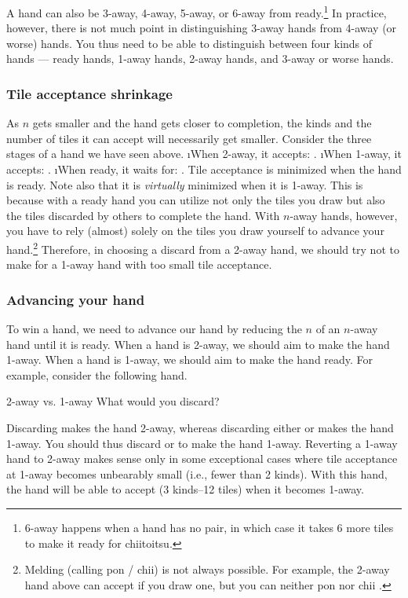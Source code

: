 \bigskip
A hand can also be 3-away, 4-away, 5-away, or 6-away from ready.\footnote{6-away happens when a hand has no pair, in which case it takes 6 more tiles to make it ready for {\jap chiitoitsu}.}  
In practice, however, there is not much point in distinguishing 3-away hands from 4-away (or worse) hands. You thus need to be able to distinguish between four kinds of hands --- ready hands, 1-away hands, 2-away hands, and 3-away or worse hands. 

\subsubsection{Tile acceptance shrinkage} 
As $n$ gets smaller and the hand gets closer to completion, the kinds and the number of tiles it can accept will necessarily get smaller. Consider the three stages of a hand we have seen above.
\bi
\i When 2-away, it accepts: {\LARGE{}}.
\i When 1-away, it accepts: {\LARGE{}}.
\i When ready, it waits for: {\LARGE{}}.
\ei
Tile acceptance is minimized when the hand is ready. Note also that it is \emph{virtually} minimized when it is 1-away. This is because with a ready hand you can utilize not only the tiles you draw but also the tiles discarded by others to complete the hand. With $n$-away hands, however, you have to rely (almost) solely on the tiles you draw yourself to advance your hand.\footnote{Melding (calling {\jap pon} / {\jap chii}) is not always possible. For example, the 2-away hand above can accept  if you draw one, but you can neither {\jap pon} nor {\jap chii} .} 
Therefore, in choosing a discard from a 2-away hand, we should try not to make for a 1-away hand with too small tile acceptance.

\subsubsection{Advancing your hand}

To win a hand, we need to advance our hand by reducing the $n$ of an $n$-away hand until it is ready.
When a hand is 2-away, we should aim to make the hand 1-away. 
When a hand is 1-away, we should aim to make the hand ready. 
For example, consider the following hand. 
\begin{itembox}[r]{2-away vs. 1-away}
\bp
{}\fa\fa\fa
\ep
\vspace{-10pt}What would you discard? \vspace{-5pt}
\end{itembox}
\noindent
Discarding {\LARGE{}} makes the hand 2-away, whereas discarding either {\LARGE{}} or {\LARGE{}} makes the hand 1-away. You should thus discard {\LARGE{}} or {\LARGE{}} to make the hand 1-away. 
Reverting a 1-away hand to 2-away makes sense only in some exceptional cases where tile acceptance at 1-away becomes unbearably small (i.e., fewer than 2 kinds).
With this hand, the hand will be able to accept {\LARGE{}} (3 kinds--12 tiles) when it becomes 1-away.

